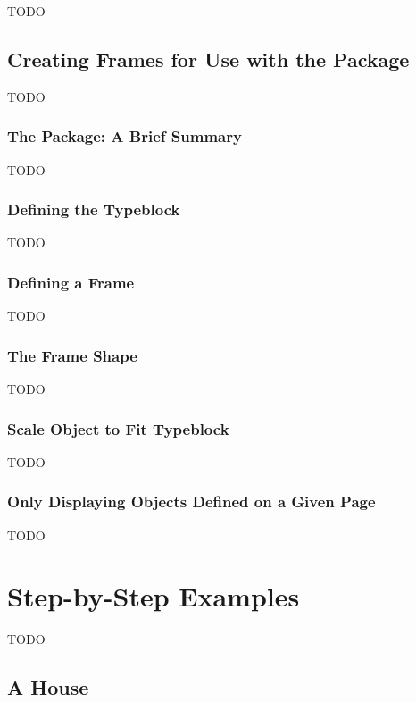 TODO


\section{Creating Frames for Use with the  Package}
\label{sec:flowframe}

TODO


\subsection{The  Package: A Brief Summary}
\label{sec:flowframesummary}

TODO


\subsection{Defining the Typeblock}\label{sec:typeblock}

TODO


\subsection{Defining a Frame}\label{sec:framedef}

TODO


\subsection{The Frame Shape}\label{sec:frameshape}

TODO


\subsection{Scale Object to Fit Typeblock}\label{sec:scaletotypeblock}

TODO


\subsection{Only Displaying Objects Defined on a Given Page}\label{sec:displaypage}

TODO


\chapter{Step-by-Step Examples}\label{sec:tutorials}

TODO


\section{A House}\label{sec:houseexample}

